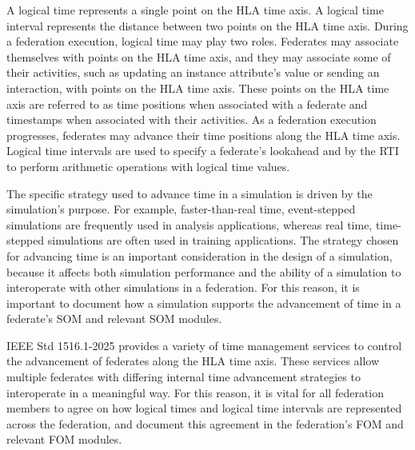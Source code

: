 \documentclass{requirements-lab}
\begin{document}
\RLCoverPage

\begingroup
\setlength{\parskip}{0.38em}
\RLSerif\fontsize{8.9pt}{12.1pt}\selectfont\color{RLInk}

A logical time represents a single point on the HLA time axis. A logical time interval represents the distance between two points on the HLA time axis. During a federation execution, logical time may play two roles. Federates may associate themselves with points on the HLA time axis, and they may associate some of their activities, such as updating an instance attribute's value or sending an interaction, with points on the HLA time axis. These points on the HLA time axis are referred to as time positions when associated with a federate and timestamps when associated with their activities. As a federation execution progresses, federates may advance their time positions along the HLA time axis. Logical time intervals are used to specify a federate's lookahead and by the RTI to perform arithmetic operations with logical time values.

The specific strategy used to advance time in a simulation is driven by the simulation's purpose. For example, faster-than-real time, event-stepped simulations are frequently used in analysis applications, whereas real time, time-stepped simulations are often used in training applications. The strategy chosen for advancing time is an important consideration in the design of a simulation, because it affects both simulation performance and the ability of a simulation to interoperate with other simulations in a federation. For this reason, it is important to document how a simulation supports the advancement of time in a federate's SOM and relevant SOM modules.

IEEE Std 1516.1-2025 provides a variety of time management services to control the advancement of federates along the HLA time axis. These services allow multiple federates with differing internal time advancement strategies to interoperate in a meaningful way. For this reason, it is vital for all federation members to agree on how logical times and logical time intervals are represented across the federation, and document this agreement in the federation's FOM and relevant FOM modules.
\end{document}
